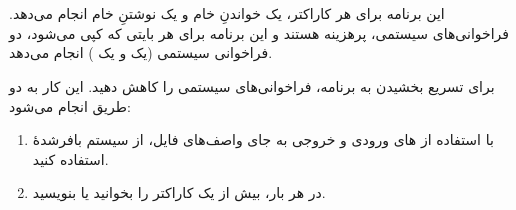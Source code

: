 \section{}
\paragraph{}\label{answer:96}
این برنامه برای هر کاراکتر، یک خواندنِ خام و یک نوشتنِ خام انجام می‌دهد. فراخوانی‌های سیستمی، پرهزینه هستند و این برنامه برای هر بایتی که کپی می‌شود، دو فراخوانی سیستمی (یک  و یک ) انجام می‌دهد.

برای تسریع بخشیدن به برنامه، فراخوانی‌های سیستمی را کاهش دهید. این کار به دو طریق انجام می‌شود:
\begin{enumerate}
    \item با استفاده از های ورودی و خروجی به جای واصف‌های فایل، از سیستم بافرشدهٔ  استفاده کنید.
    \item در هر بار، بیش از یک کاراکتر را بخوانید یا بنویسید.
\end{enumerate}